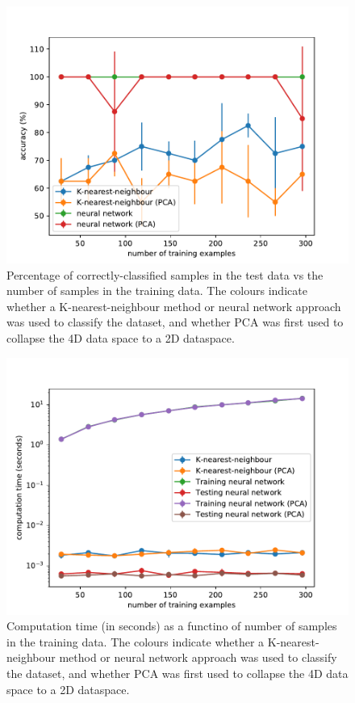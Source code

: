 \documentclass[10pt]{article}
\begin{document}
\begin{figure}
\includegraphics[scale=0.8,angle=0,trim=0cm 0cm 0.0cm 0cm]{fig_accuracy.pdf}
\caption{Percentage of correctly-classified samples in the test data vs the number of samples in the training data. The colours indicate whether a K-nearest-neighbour method or neural network approach was used to classify the dataset, and whether PCA was first used to collapse the 4D data space to a 2D dataspace.}
\label{fig_accuracy}
\end{figure}


\begin{figure}
\includegraphics[scale=0.8,angle=0,trim=0cm 0cm 0.0cm 0cm]{fig_computetime.pdf}
\caption{Computation time (in seconds) as a functino of number of samples in the training data. The colours indicate whether a K-nearest-neighbour method or neural network approach was used to classify the dataset, and whether PCA was first used to collapse the 4D data space to a 2D dataspace.}
\label{fig_time}
\end{figure}
\end{document}
